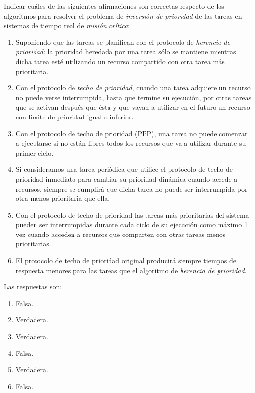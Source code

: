 \begin{ejercicio}\label{ej:rel4_12}
    Indicar cuáles de las siguientes afirmaciones son correctas respecto de los algoritmos para resolver el problema de \textit{inversión de prioridad} de las tareas en sistemas de tiempo real de \textit{misión crítica}:
    \begin{enumerate}[label=(\alph*)]
        \item Suponiendo que las tareas se planifican con el protocolo de \textit{herencia de prioridad}: la prioridad heredada por una tarea sólo se mantiene mientras dicha tarea esté utilizando un recurso compartido con otra tarea más prioritaria.
        \item Con el protocolo de \textit{techo de prioridad}, cuando una tarea adquiere un recurso no puede verse interrumpida, hasta que termine su ejecución, por otras tareas que se activan después que ésta y que vayan a utilizar en el futuro un recurso con límite de prioridad igual o inferior.
        \item Con el protocolo de techo de prioridad (PPP), una tarea no puede comenzar a ejecutarse si no están libres todos los recursos que va a utilizar durante su primer ciclo.
        \item Si consideramos una tarea periódica que utilice el protocolo de techo de prioridad inmediato para cambiar su prioridad dinámica cuando accede a recursos, siempre se cumplirá que dicha tarea no puede ser interrumpida por otra menos prioritaria que ella.
        \item Con el protocolo de techo de prioridad las tareas más prioritarias del sistema pueden ser interrumpidas durante cada ciclo de su ejecución como máximo 1 vez cuando acceden a recursos que comparten con otras tareas menos prioritarias.
        \item El protocolo de techo de prioridad original producirá siempre tiempos de respuesta menores para las tareas que el algoritmo de \textit{herencia de prioridad}.
    \end{enumerate}

    Las respuestas son:
    \begin{enumerate}[label=(\alph*)]
        \item Falsa.
        \item Verdadera.
        \item Verdadera.
        \item Falsa.
        \item Verdadera.
        \item Falsa.
    \end{enumerate}
\end{ejercicio}

